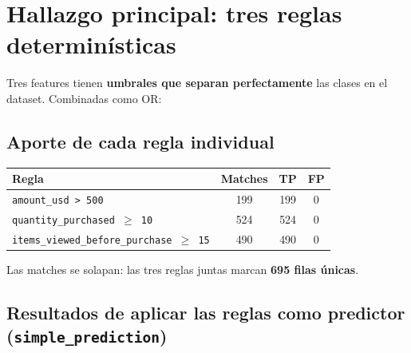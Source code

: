 \documentclass[11pt,a4paper]{article}
\begin{document}
\section{Hallazgo principal: tres reglas determin\'isticas}

Tres features tienen \textbf{umbrales que separan perfectamente} las clases en el
dataset. Combinadas como OR:

\begin{center}
\end{center}

\subsection{Aporte de cada regla individual}

\begin{center}
\begin{tabular}{l c c c}
\toprule
\textbf{Regla} & \textbf{Matches} & \textbf{TP} & \textbf{FP} \\
\midrule
\texttt{amount\_usd > 500}                          & 199 & 199 & 0 \\
\texttt{quantity\_purchased $\geq$ 10}              & 524 & 524 & 0 \\
\texttt{items\_viewed\_before\_purchase $\geq$ 15}  & 490 & 490 & 0 \\
\bottomrule
\end{tabular}
\end{center}

Las matches se solapan: las tres reglas juntas marcan \textbf{695 filas \'unicas}.

\subsection{Resultados de aplicar las reglas como predictor (\texttt{simple\_prediction})}
\end{document}
